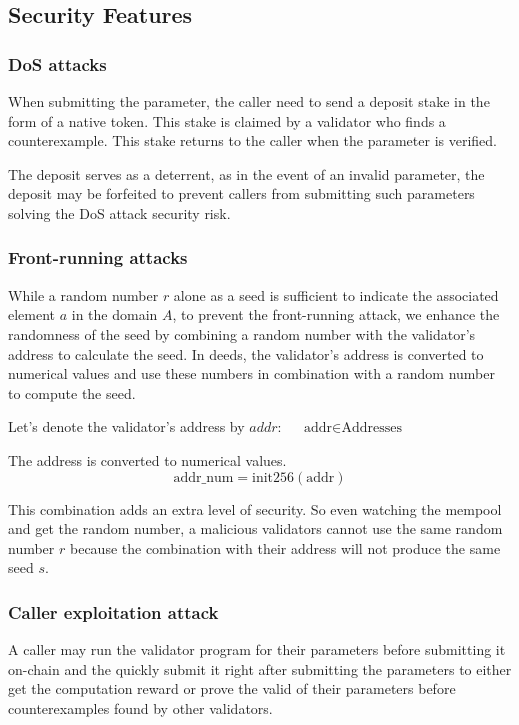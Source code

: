 \documentclass[runningheads]{llncs}
\begin{document}
\subsection{Security Features}
\subsubsection{DoS attacks}
When submitting the parameter, the caller need to send a deposit stake in the form of a native token. This stake is claimed by a validator who finds a counterexample. This stake returns to the caller when the parameter is verified. 

The deposit serves as a deterrent, as in the event of an invalid parameter, the deposit may be forfeited to prevent callers from submitting such parameters solving the DoS attack security risk. 
\subsubsection{Front-running attacks}
While a random number $r$ alone as a seed is sufficient to indicate the associated element $a$ in the domain $A$, to prevent the front-running attack, we enhance the randomness of the seed by combining a random number with the validator's address to calculate the seed. In deeds, the validator's address is converted to numerical values and use these numbers in combination with a random number to compute the seed. 

Let's denote the validator's address by $addr$: \(\quad \text{addr} \in \text{Addresses}\)

The address is converted to numerical values.
\begin{equation}
\text{addr\_num} = \text{init256}(\text{addr})
\end{equation}


This combination adds an extra level of security. So even watching the mempool and get the random number, a malicious validators cannot use the same random number $r$  because the combination with their address will not produce the same seed $s$.
\subsubsection{Caller exploitation attack}
A caller may run the validator program for their parameters before submitting it on-chain and the quickly submit it right after submitting the parameters to either get the computation reward or prove the valid of their parameters before  counterexamples found by other validators. 
\end{document}
